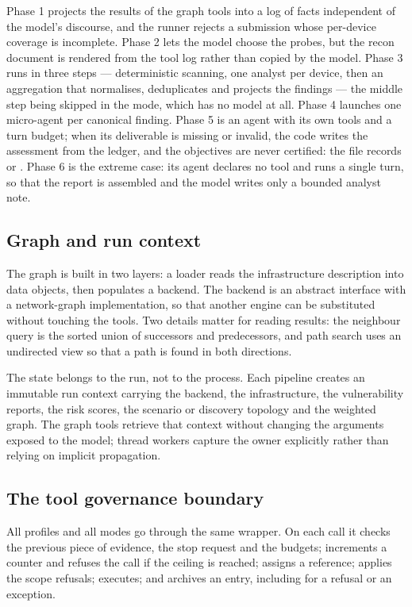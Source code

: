 Phase 1 projects the results of the graph tools into a log of facts independent of
the model's discourse, and the runner rejects a submission whose per-device
coverage is incomplete. Phase 2 lets the model choose the probes, but the recon
document is rendered from the tool log rather than copied by the model. Phase 3
runs in three steps --- deterministic scanning, one analyst per device, then an
aggregation that normalises, deduplicates and projects the findings --- the middle
step being skipped in the  mode, which has no model at all. Phase 4
launches one micro-agent per canonical finding. Phase 5 is an agent with its own tools and a turn
budget; when its deliverable is missing or invalid, the code writes the assessment
from the ledger, and the objectives are never certified: the file records
 or . Phase 6 is the extreme case: its agent declares no tool and
runs a single turn, so that the report is assembled and the model writes only a
bounded analyst note.

\subsection{Graph and run context}

The graph is built in two layers: a loader reads the infrastructure description
into data objects, then populates a backend. The backend is an abstract interface
with a network-graph implementation, so that another engine can be substituted
without touching the tools. Two details matter for reading results: the neighbour
query is the sorted union of successors and predecessors, and path search uses an
undirected view so that a path is found in both directions.

The state belongs to the run, not to the process. Each pipeline creates an
immutable run context carrying the backend, the infrastructure, the vulnerability
reports, the risk scores, the scenario or discovery topology and the weighted
graph. The graph tools retrieve that context without changing the arguments
exposed to the model; thread workers capture the owner explicitly rather than
relying on implicit propagation.

\subsection{The tool governance boundary}

All profiles and all modes go through the same wrapper. On each call it checks the
previous piece of evidence, the stop request and the budgets; increments a counter
and refuses the call if the ceiling is reached; assigns a reference; applies the
scope refusals; executes; and archives an entry, including for a refusal or an
exception.

